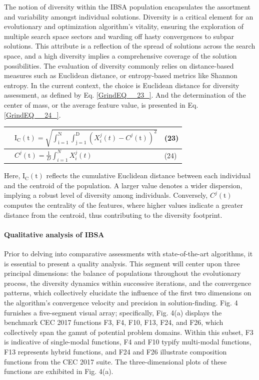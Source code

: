 \documentclass{article} %
\begin{document}
The notion of diversity within the IBSA population encapsulates the assortment and variability amongst individual solutions. Diversity is a critical element for an evolutionary and optimization algorithm's vitality, ensuring the exploration of multiple search space sectors and warding off hasty convergences to subpar solutions. This attribute is a reflection of the spread of solutions across the search space, and a high diversity implies a comprehensive coverage of the solution possibilities. The evaluation of diversity commonly relies on distance-based measures such as Euclidean distance, or entropy-based metrics like Shannon entropy. In the current context, the choice is Euclidean distance for diversity assessment, as defined by Eq. \eqref{GrindEQ__23_}. And the determination of the center of mass, or the average feature value, is presented in Eq. \eqref{GrindEQ__24_}.

\begin{tabular}{|p{0.4in}|p{2.9in}|p{0.5in}|} \hline 
 & ${\mathrm{I}}_{\mathrm{C}}\left(\mathrm{t}\right)\mathrm{=}\sqrt{\int^{\mathrm{N}}_{\mathrm{i=1}}{\int^{\mathrm{D}}_{\mathrm{j=1}}{{\left(X^j_i\left(t\right)-C^j\mathrm{(t)}\right)}^{\mathrm{2}}}}}$ & (23) \\ \hline 
 & $C^j\mathrm{(t)}\mathrm{=}\frac{\mathrm{1}}{D}\int^N_{i\mathrm{=1}}{X^j_i\left(t\right)}$ & (24) \\ \hline 
\end{tabular}

Here, ${\mathrm{I}}_{\mathrm{C}}\left(\mathrm{t}\right)$ reflects the cumulative Euclidean distance between each individual and the centroid of the population. A larger value denotes a wider dispersion, implying a robust level of diversity among individuals. Conversely, $C^j\mathrm{(t)}$ computes the centrality of the features, where higher values indicate a greater distance from the centroid, thus contributing to the diversity footprint.


\paragraph{ Qualitative analysis of IBSA}

Prior to delving into comparative assessments with state-of-the-art algorithms, it is essential to present a quality analysis. This segment will center upon three principal dimensions: the balance of populations throughout the evolutionary process, the diversity dynamics within successive iterations, and the convergence patterns, which collectively elucidate the influence of the first two dimensions on the algorithm's convergence velocity and precision in solution-finding. Fig. 4 furnishes a five-segment visual array; specifically, Fig. 4(a) displays the benchmark CEC 2017 functions F3, F4, F10, F13, F24, and F26, which collectively span the gamut of potential problem domains. Within this subset, F3 is indicative of single-modal functions, F4 and F10 typify multi-modal functions, F13 represents hybrid functions, and F24 and F26 illustrate composition functions from the CEC 2017 suite. The three-dimensional plots of these functions are exhibited in Fig. 4(a).
\end{document}
